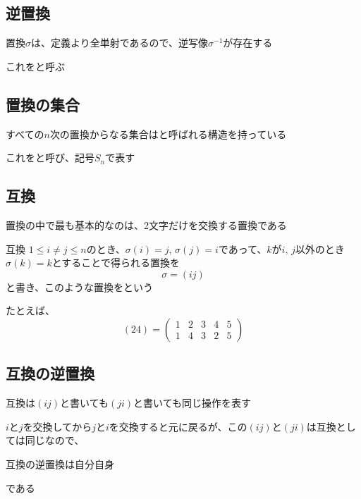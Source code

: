 \documentclass[../../../topic_linear-algebra]{subfiles}
\begin{document}
\subsection{逆置換}

置換$\sigma$は、定義より全単射であるので、逆写像$\sigma^{-1}$が存在する

これをと呼ぶ

\subsection{置換の集合}

すべての$n$次の置換からなる集合はと呼ばれる構造を持っている

これをと呼び、記号$S_n$で表す

\subsection{互換}

置換の中で最も基本的なのは、2文字だけを交換する置換である

\begin{definition*}{互換}
  $1 \leq i \neq j \leq n$のとき、$\sigma(i) = j,\, \sigma(j) = i$であって、$k$が$i,\,j$以外のとき$\sigma(k)=k$とすることで得られる置換を
  \begin{equation*}
    \sigma = (ij)
  \end{equation*}
  と書き、このような置換をという
\end{definition*}

たとえば、
\begin{equation*}
  (24) = \begin{pmatrix}
    1 & 2 & 3 & 4 & 5 \\
    1 & 4 & 3 & 2 & 5
  \end{pmatrix}
\end{equation*}

\subsection{互換の逆置換}

互換は$(ij)$と書いても$(ji)$と書いても同じ操作を表す

$i$と$j$を交換してから$j$と$i$を交換すると元に戻るが、この$(ij)$と$(ji)$は互換としては同じなので、
\begin{shaded}
  互換の逆置換は自分自身
\end{shaded}
である
\end{document}
